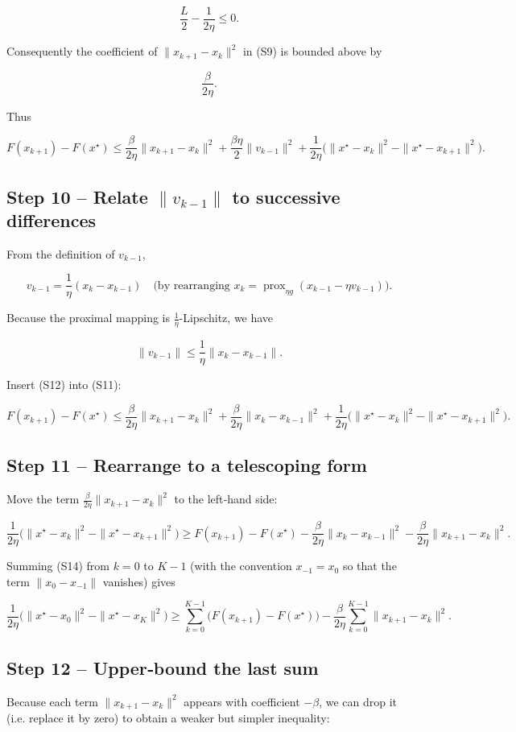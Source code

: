 \documentclass{article}
\newcommand{\prox}{\operatorname{prox}}
\begin{document}
\[
\frac{L}{2}-\frac{1}{2\eta}\le 0.
\]

Consequently the coefficient of \(\|x_{k+1}-x_k\|^{2}\) in (S9) is bounded above by  

\[
\frac{\beta}{2\eta}.
\tag{S10}
\]

Thus  

\[
F(x_{k+1})-F(x^{\star})
\le
\frac{\beta}{2\eta}\|x_{k+1}-x_k\|^{2}
+\frac{\beta\eta}{2}\|v_{k-1}\|^{2}
+\frac{1}{2\eta}\bigl(\|x^{\star}-x_k\|^{2}
-\|x^{\star}-x_{k+1}\|^{2}\bigr).
\tag{S11}
\]

\subsection*{Step 10 – Relate \(\|v_{k-1}\|\) to successive differences}
From the definition of \(v_{k-1}\),

\[
v_{k-1}= \frac{1}{\eta}(x_{k}-x_{k-1}) \quad\text{(by rearranging }x_{k}= \prox_{\eta g}(x_{k-1}-\eta v_{k-1})\text{)}.
\]

Because the proximal mapping is \(\frac{1}{\eta}\)-Lipschitz, we have  

\[
\|v_{k-1}\|\le\frac{1}{\eta}\|x_k-x_{k-1}\|.
\tag{S12}
\]

Insert (S12) into (S11):

\[
F(x_{k+1})-F(x^{\star})
\le
\frac{\beta}{2\eta}\|x_{k+1}-x_k\|^{2}
+\frac{\beta}{2\eta}\|x_k-x_{k-1}\|^{2}
+\frac{1}{2\eta}\bigl(\|x^{\star}-x_k\|^{2}
-\|x^{\star}-x_{k+1}\|^{2}\bigr).
\tag{S13}
\]

\subsection*{Step 11 – Rearrange to a telescoping form}
Move the term \(\frac{\beta}{2\eta}\|x_{k+1}-x_k\|^{2}\) to the left‑hand side:

\[
\frac{1}{2\eta}\bigl(\|x^{\star}-x_k\|^{2}
-\|x^{\star}-x_{k+1}\|^{2}\bigr)
\ge
F(x_{k+1})-F(x^{\star})
-\frac{\beta}{2\eta}\|x_k-x_{k-1}\|^{2}
-\frac{\beta}{2\eta}\|x_{k+1}-x_k\|^{2}.
\tag{S14}
\]

Summing (S14) from \(k=0\) to \(K-1\) (with the convention \(x_{-1}=x_0\) so that the term \(\|x_0-x_{-1}\|\) vanishes) gives  

\[
\frac{1}{2\eta}\bigl(\|x^{\star}-x_0\|^{2}
-\|x^{\star}-x_{K}\|^{2}\bigr)
\ge
\sum_{k=0}^{K-1}\bigl(F(x_{k+1})-F(x^{\star})\bigr)
-\frac{\beta}{2\eta}\sum_{k=0}^{K-1}\|x_{k+1}-x_k\|^{2}.
\tag{S15}
\]

\subsection*{Step 12 – Upper‑bound the last sum}
Because each term \(\|x_{k+1}-x_k\|^{2}\) appears with coefficient \(-\beta\), we can drop it (i.e. replace it by zero) to obtain a weaker but simpler inequality:
\end{document}
